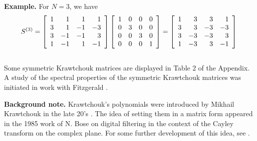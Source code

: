 \documentclass[12pt]{article}
\numberwithin{equation}{section}
\begin{document}
\bigskip\noindent
{\bf Example. }  For $N=3$, we have
$$
S^{(3)} =
       \left[\begin{array}{rrrr} 
                      1 &  1 &  1  &  1 \cr
                      3 &  1 & -1  & -3 \cr
                      3 & -1 & -1  &  3 \cr
                      1 & -1 &  1  & -1 \cr \end{array}\right]
       \left[\begin{array}{rrrr} 
                      1 &  0 & 0 & 0 \cr
                      0 &  3 & 0 & 0 \cr
                      0 &  0 & 3 & 0 \cr
                      0 &  0 & 0 & 1 \cr \end{array}\right]
=
      \left[\begin{array}{rrrr} 
                     1 &  3 &  3  &  1 \cr
                     3 &  3 & -3  & -3 \cr
                     3 & -3 & -3  &  3 \cr
                     1 & -3 &  3  & -1 \cr \end{array}\right] 
$$ 
\\

Some symmetric Krawtchouk  matrices are displayed in Table 2 of the
Appendix.  A study of the spectral properties of the symmetric Krawtchouk matrices
was initiated in work with Fitzgerald \cite{FF}.\bigskip

\noindent
{\bf Background note. }
Krawtchouk's polynomials were introduced  
by Mikhail Krawtchouk in the late 20's \cite{Kra, Kra2}. %
The idea of setting them in a matrix form appeared in the 1985 work 
of N. Bose \cite{B} %
on digital filtering in the context of the Cayley
transform on the complex plane. 
For some further development of this idea, see \cite{FK}.
\\
\end{document}
